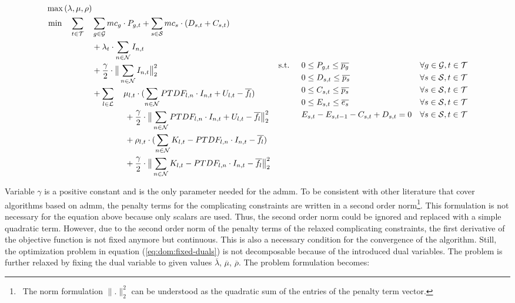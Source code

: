 \begin{subequations}
	\begin{align}
		\max{(\lambda, \mu, \rho)} \label{eq:dom:fixed-duals} \\
		 \min \quad \sum_{t\in\mathcal{T}} \quad & \sum_{g\in\mathcal{G}}mc_g \cdot P_{g,t} + \sum_{s\in\mathcal{S}}mc_s \cdot (D_{s,t}+C_{s,t}) \nonumber \\
		 & + \lambda_t \cdot \sum_{n \in \mathcal{N}} I_{n,t} \nonumber \\
		 & + \frac{\gamma}{2} \cdot \big\|\sum_{n \in \mathcal{N}} I_{n,t}\big\|^2_2 \nonumber \\
		 & +  \sum_{l \in \mathcal{L}} \quad \mu_{l,t} \cdot (\sum_{n \in \mathcal{N}} PTDF_{l,n} \cdot I_{n,t} + U_{l,t} - \overline{f_l}) \nonumber \\
		 & \qquad \qquad + \frac{\gamma}{2} \cdot \big\| \sum_{n \in \mathcal{N}} PTDF_{l,n} \cdot I_{n,t} + U_{l,t} - \overline{f_l} \big\|^2_2 \nonumber \\
		 & \qquad \qquad + \rho_{l,t} \cdot (\sum_{n \in \mathcal{N}} K_{l,t} - PTDF_{l,n} \cdot I_{n,t} - \overline{f_l}) \nonumber \\
		 & \qquad \qquad + \frac{\gamma}{2} \cdot \big\|\sum_{n \in \mathcal{N}} K_{l,t} - PTDF_{l,n} \cdot I_{n,t} - \overline{f_l} \big\|^2_2 \nonumber
	\end{align}
	\begin{align}
		 \text{s.t. } \quad & 0 \leq P_{g,t} \leq \overline{p_g} && \forall g \in \set{G}, t \in \set{T}\\
		 & 0 \leq D_{s,t} \leq \overline{p_s} && \forall s \in \set{S}, t \in \set{T} \\
		 & 0 \leq C_{s,t} \leq \overline{p_s} && \forall s \in \set{S}, t \in \set{T} \\
		 & 0 \leq E_{s,t} \leq \overline{e_s} && \forall s \in \set{S}, t \in \set{T} \\
		 & E_{s,t} - E_{s,t-1} - C_{s,t} + D_{s,t} = 0 && \forall s \in \set{S}, t \in \set{T}
	\end{align}
\end{subequations}

Variable $\gamma$ is a positive constant and is the only parameter needed for the \gls{admm}. To be consistent with other literature that cover algorithms based on \gls{admm}, the penalty terms for the complicating constraints are written in a second order norm\footnote{~The norm formulation $\big\| . \big\|^2_2$ can be understood as the quadratic sum of the entries of the penalty term vector.}. This formulation is not necessary for the equation above because only scalars are used. Thus, the second order norm could be ignored and replaced with a simple quadratic term. However, due to the second order norm of the penalty terms of the relaxed complicating constraints, the first derivative of the objective function is not fixed anymore but continuous. This is also a necessary condition for the convergence of the algorithm. Still, the optimization problem in equation (\ref{eq:dom:fixed-duals}) is not decomposable because of the introduced dual variables. The problem is further relaxed by fixing the dual variable to given values $\overline{\lambda}$, $\overline{\mu}$, $\overline{\rho}$. The problem formulation becomes:

